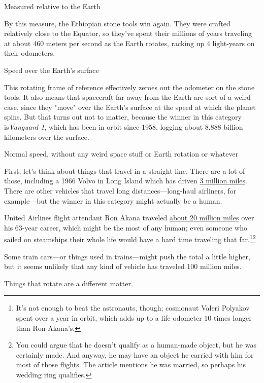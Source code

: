 {{Measured relative to the Earth}

{By this measure, the Ethiopian stone tools win again. They were crafted relatively close to the Equator, so they've spent their millions of years traveling at about 460 meters per second as the Earth rotates, racking up 4 light-years on their odometers.}

{Speed over the Earth's surface}

{This rotating frame of reference effectively zeroes out the odometer on the stone tools. It also means that spacecraft far away from the Earth are sort of a weird case, since they "move" over the Earth's surface at the speed at which the planet spins. But that turns out not to matter, because the winner in this category is\emph{Vanguard 1}, which has been in orbit since 1958, logging about 8.888 billion kilometers over the surface.}

{Normal speed, without any weird space stuff or Earth rotation or whatever}

{First, let's think about things that travel in a straight line. There are a lot of those, including a 1966 Volvo in Long Island which has driven \href{http://www.today.com/news/man-drives-record-3-million-miles-same-1966-volvo-8C11307586}{3 million miles}. There are other vehicles that travel long distances—long-haul airliners, for example—but the winner in this category might actually be a human.}

{United Airlines flight attendant Ron Akana traveled \href{http://www.nytimes.com/2012/03/18/us/63-years-flying-from-glamour-to-days-of-gray.html?pagewanted=all}{about 20 million miles} over his 63-year career, which might be the most of any human; even someone who sailed on steamships their whole life would have a hard time traveling that far.{\footnote{It's not enough to beat the astronauts, though; cosmonaut Valeri Polyakov spent over a year in orbit, which adds up to a life odometer 10 times longer than Ron Akana's.} } ​{\footnote{You could argue that he doesn't qualify as a human-made object, but he was certainly made. And anyway, he may have an object he carried with him for most of those flights. The article mentions he was married, so perhaps his wedding ring qualifies.} } }

{Some train cars—or things used in trains—might push the total a little higher, but it seems unlikely that any kind of vehicle has traveled 100 million miles.}

{Things that rotate are a different matter.}

}
